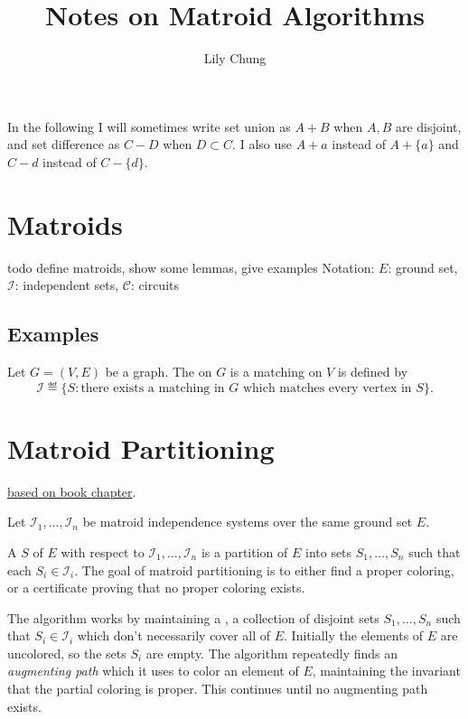 \documentclass{article}
\title{Notes on Matroid Algorithms}
\author{Lily Chung}
\date{}
\newcommand*{\I}[0]{\mathcal{I}}
\newcommand*{\Cc}[0]{\mathcal{C}}
\begin{document}
\maketitle

In the following I will sometimes write set union as $A + B$ when $A, B$ are disjoint, and set difference as $C - D$ when $D \subset C$.
I also use $A + a$ instead of $A + \{a\}$ and $C - d$ instead of $C - \{d\}$.

\section*{Matroids}

todo define matroids, show some lemmas, give examples
Notation: $E$: ground set, $\I$: independent sets, $\Cc$: circuits

\subsection*{Examples}

\begin{example}
  Let $G = (V, E)$ be a graph.  The  on $G$ is a matching on $V$ is defined by \[\I \eqdef \{S : \text{there exists a matching in $G$ which matches every vertex in $S$}\}.\]
\end{example}

\section*{Matroid Partitioning}

\href{https://page.math.tu-berlin.de/\~felsner/Lehre/SemMatS/Literatur/ScheinermanUllman:FractionalArboricity.pdf}{based on book chapter}.

Let $\I_1, \dots, \I_n$ be matroid independence systems over the same ground set $E$.

A  $S$ of $E$ with respect to $\I_1, \dots, \I_n$ is a partition of $E$ into sets $S_1, \dots, S_n$ such that each $S_i \in \I_i$.
The goal of matroid partitioning is to either find a proper coloring, or a certificate proving that no proper coloring exists.

The algorithm works by maintaining a ,
a collection of disjoint sets $S_1, \dots, S_n$ such that $S_i \in \I_i$ which don't necessarily cover all of $E$.
Initially the elements of $E$ are uncolored, so the sets $S_i$ are empty.
The algorithm repeatedly finds an \emph{augmenting path}
which it uses to color an element of $E$,
maintaining the invariant that the partial coloring is proper.
This continues until no augmenting path exists.
\end{document}

